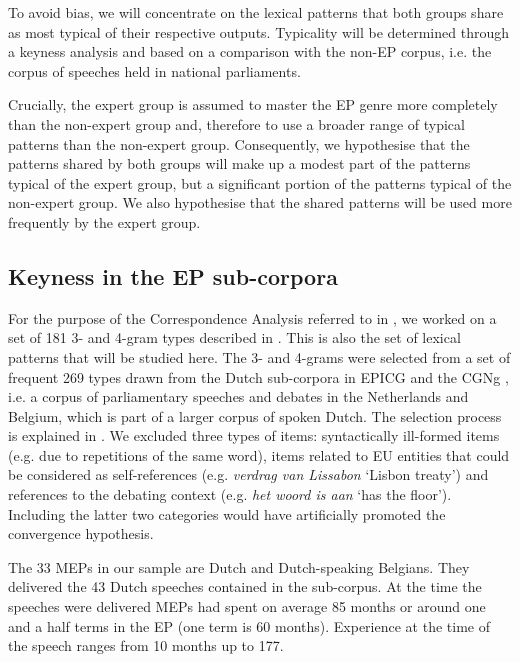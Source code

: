 \documentclass[output=paper]{langscibook}
\begin{document}
To avoid bias, we will concentrate on the lexical patterns that both groups share as most typical of their respective outputs. Typicality will be determined through a keyness analysis and based on a comparison with the non-EP corpus, i.e. the corpus of speeches held in national parliaments. 

Crucially, the expert group is assumed to master the EP genre more completely than the non-expert group and, therefore to use a broader range of typical patterns than the non-expert group. Consequently, we hypothesise that the patterns shared by both groups will make up a modest part of the patterns typical of the expert group, but a significant portion of the patterns typical of the non-expert group. We also hypothesise that the shared patterns will be used more frequently by the expert group. 

\subsection{Keyness in the EP sub-corpora}\label{sec:defrancq:5.2}

For the purpose of the Correspondence Analysis referred to in , we worked on a set of 181 3- and 4-gram types described in \citet{DefrancqPlevoetsforthcoming}. This is also the set of lexical patterns that will be studied here. The 3- and 4-grams were selected from a set of frequent 269 types drawn from the Dutch sub-corpora in EPICG \citep{BernardiniEtAl2018} and the CGNg \citep{Oostdijk2000}, i.e. a corpus of parliamentary speeches and debates in the Netherlands and Belgium, which is part of a larger corpus of spoken Dutch. The selection process is explained in \citet{DefrancqPlevoets2018}. We excluded three types of items: syntactically ill-formed items (e.g. due to repetitions of the same word), items related to EU entities that could be considered as self-references (e.g. \textit{verdrag van Lissabon} ‘Lisbon treaty’) and references to the debating context (e.g. \textit{het woord is aan} ‘has the floor’). Including the latter two categories would have artificially promoted the convergence hypothesis.

The 33 MEPs in our sample are Dutch and Dutch-speaking Belgians. They delivered the 43 Dutch speeches contained in the sub-corpus. At the time the speeches were delivered MEPs had spent on average 85 months or around one and a half terms in the EP (one term is 60 months). Experience at the time of the speech ranges from 10 months up to 177.  
\end{document}
